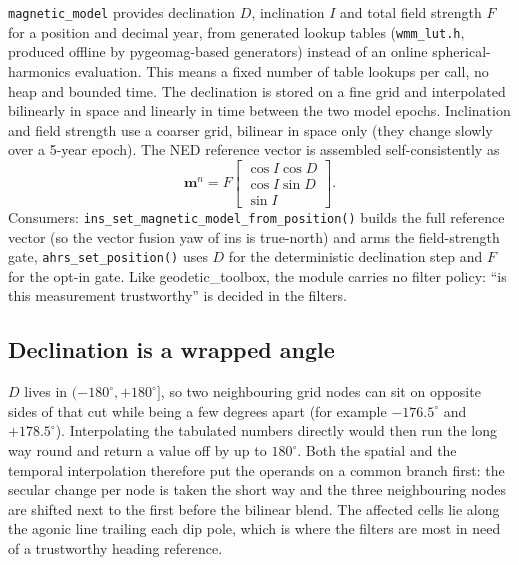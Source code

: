 \documentclass[11pt,a4paper]{article}
\newcommand{\vect}[1]{\bm{#1}}
\newcommand{\nframe}{n}
\newcommand{\code}[1]{\texttt{#1}}
\begin{document}
\code{magnetic\_\allowbreak{}model} provides declination $D$, inclination $I$ and
total field strength $F$ for a position and decimal year, from
generated lookup tables (\code{wmm\_\allowbreak{}lut.h}, produced offline by
pygeomag-based generators) instead of an online spherical-harmonics
evaluation. This means a fixed number of table lookups per call, no heap and
bounded time. The declination is stored on a fine grid and interpolated
bilinearly in space and linearly in time between the two model epochs.
Inclination and field strength use a coarser grid, bilinear in space only (they
change slowly over a 5-year epoch). The NED reference vector is
assembled self-consistently as
\begin{equation}
  \vect{m}^\nframe = F
  \begin{bmatrix}
    \cos I \cos D \\ \cos I \sin D \\ \sin I
  \end{bmatrix}.
\end{equation}
Consumers: \code{ins\_\allowbreak{}set\_\allowbreak{}magnetic\_\allowbreak{}model\_\allowbreak{}from\_\allowbreak{}position()} builds
the full reference vector (so the vector fusion yaw of ins is true-north)
and arms the field-strength gate,
\code{ahrs\_\allowbreak{}set\_\allowbreak{}position()} uses $D$ for the deterministic declination
step and $F$ for the opt-in gate. Like geodetic\_toolbox, the module
carries no filter policy: ``is this measurement trustworthy'' is
decided in the filters.

\subsection{Declination is a wrapped angle}
\label{sec:wmm-wrap}

$D$ lives in $(-180^\circ, +180^\circ]$, so two neighbouring grid nodes
can sit on opposite sides of that cut while being a few degrees apart
(for example $-176.5^\circ$ and $+178.5^\circ$). Interpolating the
tabulated numbers directly would then run the long way round and return
a value off by up to $180^\circ$. Both the spatial and the temporal
interpolation therefore put the operands on a common branch first: the
secular change per node is taken the short way and the three
neighbouring nodes are shifted next to the first before the bilinear
blend. The affected cells lie along the agonic line trailing each dip
pole, which is where the filters are most in need of a trustworthy
heading reference.
\end{document}
